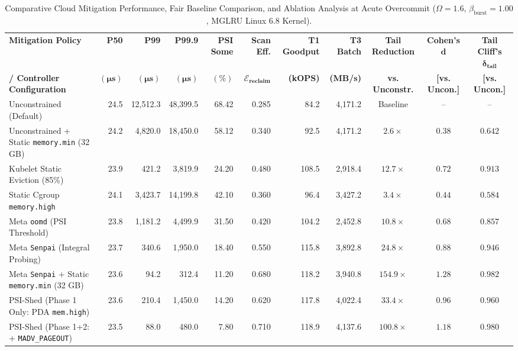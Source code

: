 \begin{table}[t]
\centering
\caption{Comparative Cloud Mitigation Performance, Fair Baseline Comparison, and Ablation Analysis at Acute Overcommit ($\Omega = 1.6$, $\beta_{\text{burst}} = 1.00$, MGLRU Linux 6.8 Kernel).}
\label{tab:mitigation}
\footnotesize
\begin{adjustbox}{width=\textwidth}
\begin{tabular}{lrrrrrrrccc}
\toprule
\textbf{Mitigation Policy} & \textbf{P50} & \textbf{P99} & \textbf{P99.9} & \textbf{PSI Some} & \textbf{Scan Eff.} & \textbf{T1 Goodput} & \textbf{T3 Batch} & \textbf{Tail Reduction} & \textbf{Cohen's} $\mathbf{d}$ & \textbf{Tail Cliff's} $\mathbf{\delta_{\text{tail}}}$ \\
\textbf{/ Controller Configuration} & $\mathbf{(\mu s)}$ & $\mathbf{(\mu s)}$ & $\mathbf{(\mu s)}$ & $\mathbf{(\%)}$ & $\mathbf{\mathcal{E}_{\text{reclaim}}}$ & \textbf{(kOPS)} & \textbf{(MB/s)} & \textbf{vs. Unconstr.} & \textbf{[vs. Uncon.]} & \textbf{[vs. Uncon.]} \\
\midrule
Unconstrained (Default) & 24.5 & 12,512.3 & 48,399.5 & 68.42 & 0.285 & 84.2 & 4,171.2 & Baseline & -- & -- \\
Unconstrained + Static \texttt{memory.min} (32 GB) & 24.2 & 4,820.0 & 18,450.0 & 58.12 & 0.340 & 92.5 & 4,171.2 & $2.6\times$ & $0.38$ & $0.642$ \\
Kubelet Static Eviction (85\%) & 23.9 & 421.2 & 3,819.9 & 24.20 & 0.480 & 108.5 & 2,918.4 & $12.7\times$ & $0.72$ & $0.913$ \\
Static Cgroup \texttt{memory.high} & 24.1 & 3,423.7 & 14,199.8 & 42.10 & 0.360 & 96.4 & 3,427.2 & $3.4\times$ & $0.44$ & $0.584$ \\
Meta \texttt{oomd} (PSI Threshold) & 23.8 & 1,181.2 & 4,499.9 & 31.50 & 0.420 & 104.2 & 2,452.8 & $10.8\times$ & $0.68$ & $0.857$ \\
Meta \texttt{Senpai} (Integral Probing) & 23.7 & 340.6 & 1,950.0 & 18.40 & 0.550 & 115.8 & 3,892.8 & $24.8\times$ & $0.88$ & $0.946$ \\
Meta \texttt{Senpai} + Static \texttt{memory.min} (32 GB) & 23.6 & 94.2 & 312.4 & 11.20 & 0.680 & 118.2 & 3,940.8 & $154.9\times$ & $1.28$ & $0.982$ \\
PSI-Shed (Phase 1 Only: PDA \texttt{mem.high}) & 23.6 & 210.4 & 1,450.0 & 14.20 & 0.620 & 117.8 & 4,022.4 & $33.4\times$ & $0.96$ & $0.960$ \\
PSI-Shed (Phase 1+2: + \texttt{MADV\_PAGEOUT}) & 23.5 & 88.0 & 480.0 & 7.80 & 0.710 & 118.9 & 4,137.6 & $100.8\times$ & $1.18$ & $0.980$ \\

\end{tabular}
\end{adjustbox}
\end{table}
